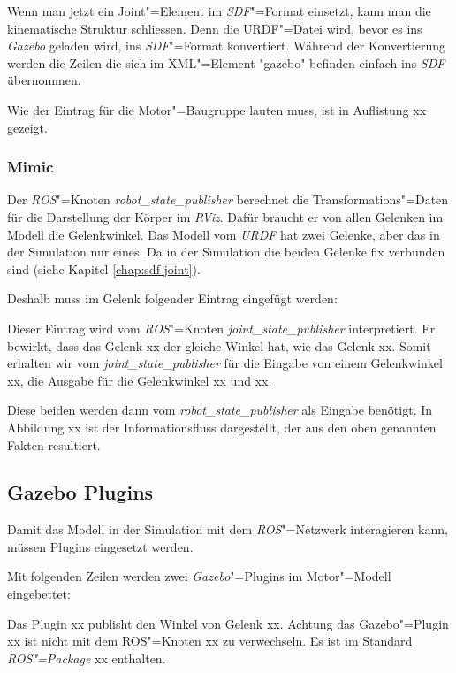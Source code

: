 Wenn man jetzt ein Joint"=Element im \textit{SDF}"=Format einsetzt, kann man die kinematische Struktur schliessen.
Denn die {URDF}"=Datei wird, bevor es ins \textit{Gazebo} geladen wird, ins \textit{SDF}"=Format konvertiert.
Während der Konvertierung werden die Zeilen die sich im XML"=Element \textsc{"}gazebo\textsc{"} befinden einfach ins \textit{SDF} übernommen.

Wie der Eintrag für die Motor"=Baugruppe lauten muss, ist in Auflistung xx gezeigt.

\subsubsection{Mimic}
\label{chap:mimic}
Der \textit{ROS}"=Knoten \textit{robot\_state\_publisher} berechnet die Transformations"=Daten für die Darstellung der Körper im \textit{RViz}.
Dafür braucht er von allen Gelenken im Modell die Gelenkwinkel.
Das Modell vom \textit{URDF} hat zwei Gelenke, aber das in der Simulation nur eines.
Da in der Simulation die beiden Gelenke fix verbunden sind (siehe Kapitel \ref{chap:sdf-joint}).

Deshalb muss im Gelenk folgender Eintrag eingefügt werden: %

Dieser Eintrag wird vom \textit{ROS}"=Knoten \textit{joint\_state\_publisher} interpretiert.
Er bewirkt, dass das Gelenk xx der gleiche Winkel hat, wie das Gelenk xx.
Somit erhalten wir vom \textit{joint\_state\_publisher} für die Eingabe von einem Gelenkwinkel xx, die Ausgabe für die Gelenkwinkel xx und xx.

Diese beiden werden dann vom \textit{robot\_state\_publisher} als Eingabe benötigt.
In Abbildung xx ist der Informationsfluss dargestellt, der aus den oben genannten Fakten resultiert.

\subsection{Gazebo Plugins}
Damit das Modell in der Simulation mit dem \textit{ROS}"=Netzwerk interagieren kann, müssen Plugins eingesetzt werden.

Mit folgenden Zeilen werden zwei \textit{Gazebo}"=Plugins im Motor"=Modell eingebettet:

Das Plugin xx publisht den Winkel von Gelenk xx.
Achtung das Gazebo"=Plugin xx ist nicht mit dem ROS"=Knoten xx zu verwechseln.
Es ist im Standard \textit{ROS"=Package} xx enthalten.

